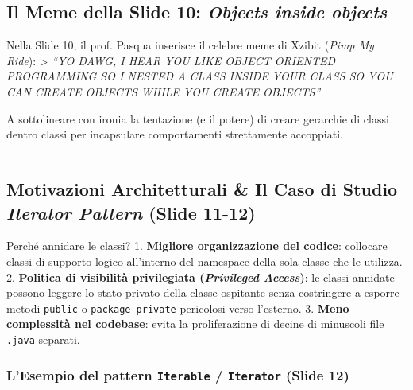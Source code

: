 \documentclass[11pt,a4paper,oneside]{report}
\newcommand{\passthrough}[1]{#1}
\begin{document}
\subsection{\texorpdfstring{Il Meme della Slide 10: \emph{Objects inside
objects}}{Il Meme della Slide 10: Objects inside objects}}\label{chap13_il-meme-della-slide-10-objects-inside-objects}

Nella Slide 10, il prof. Pasqua inserisce il celebre meme di Xzibit
(\emph{Pimp My Ride}): \textgreater{} \emph{``YO DAWG, I HEAR YOU LIKE
OBJECT ORIENTED PROGRAMMING SO I NESTED A CLASS INSIDE YOUR CLASS SO YOU
CAN CREATE OBJECTS WHILE YOU CREATE OBJECTS''}

A sottolineare con ironia la tentazione (e il potere) di creare
gerarchie di classi dentro classi per incapsulare comportamenti
strettamente accoppiati.

\begin{center}\rule{0.5\linewidth}{0.5pt}\end{center}

\subsection{\texorpdfstring{Motivazioni Architetturali \& Il Caso di
Studio \emph{Iterator Pattern} (Slide
11-12)}{Motivazioni Architetturali \& Il Caso di Studio Iterator Pattern (Slide 11-12)}}\label{chap13_motivazioni-architetturali-il-caso-di-studio-iterator-pattern-slide-11-12}

Perché annidare le classi? 1. \textbf{Migliore organizzazione del
codice}: collocare classi di supporto logico all'interno del namespace
della sola classe che le utilizza. 2. \textbf{Politica di visibilità
privilegiata (\emph{Privileged Access})}: le classi annidate possono
leggere lo stato privato della classe ospitante senza costringere a
esporre metodi \passthrough{\lstinline!public!} o
\passthrough{\lstinline!package-private!} pericolosi verso l'esterno. 3.
\textbf{Meno complessità nel codebase}: evita la proliferazione di
decine di minuscoli file \passthrough{\lstinline!.java!} separati.

\subsubsection{\texorpdfstring{L'Esempio del pattern \texttt{Iterable} /
\texttt{Iterator} (Slide
12)}{L'Esempio del pattern Iterable / Iterator (Slide 12)}}\label{chap13_lesempio-del-pattern-iterable-iterator-slide-12}
\end{document}
